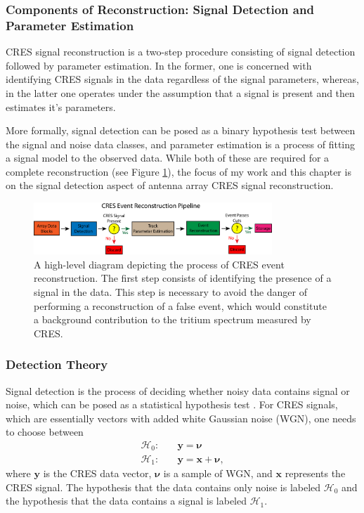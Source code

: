 \subsubsection*{Components of Reconstruction: Signal Detection and Parameter Estimation}

CRES signal reconstruction is a two-step procedure consisting of signal detection followed by parameter estimation. In the former, one is concerned with identifying CRES signals in the data regardless of the signal parameters, whereas, in the latter one operates under the assumption that a signal is present and then estimates it's parameters. 

More formally, signal detection can be posed as a binary hypothesis test between the signal and noise data classes, and parameter estimation is a process of fitting a signal model to the observed data. While both of these are required for a complete reconstruction (see Figure \ref{fig:chap4-pter-pipeline}), the focus of my work and this chapter is on the signal detection aspect of antenna array CRES signal reconstruction.

\begin{figure}[htbp]
    \centering
    \includegraphics[width=0.8\textwidth]{figs/Chapter-4/230108_deepfilter_paper_event_reconstruction_pipeline.png}
    \caption{A high-level diagram depicting the process of CRES event reconstruction. The first step consists of identifying the presence of a signal in the data. This step is necessary to avoid the danger of performing a reconstruction of a false event, which would constitute a background contribution to the tritium spectrum measured by CRES.}
    \label{fig:chap4-pter-pipeline}
\end{figure}

\subsubsection*{Detection Theory}

Signal detection is the process of deciding whether noisy data contains signal or noise, which can be posed as a statistical hypothesis test \cite{detection_theory}. For CRES signals, which are essentially vectors with added white Gaussian noise (WGN), one needs to choose between
\begin{align}
    \mathcal{H}_0:&\quad\bm{y}=\bm{\nu}\\
    \mathcal{H}_1:&\quad\bm{y}=\bm{x}+\bm{\nu},
\end{align}
where $\bm{y}$ is the CRES data vector, $\bm{\nu}$ is a sample of WGN, and $\bm{x}$ represents the CRES signal. The hypothesis that the data contains only noise is labeled $\mathcal{H}_0$ and the hypothesis that the data contains a signal is labeled $\mathcal{H}_1$.

